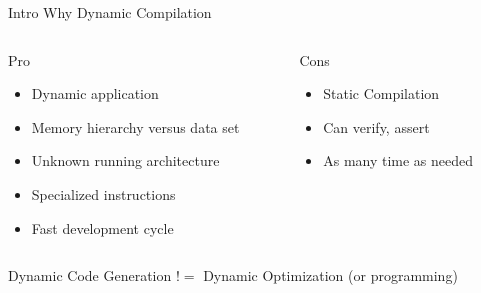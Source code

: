 %
\begin{Frame}{Intro Why Dynamic Compilation}
  \begin{columns}[t]
    \begin{column}{5cm} %
      \begin{block}{Pro}
        \begin{itemize}
        \item Dynamic application
        \item Memory hierarchy versus data set
        \item Unknown running architecture
        \item Specialized instructions
        \item Fast development cycle
        \end{itemize}
      \end{block} 
    \end{column}
    
    \begin{column}{5cm} %
      \begin{block}{Cons}
        \begin{itemize}
        \item Static Compilation
        \item Can verify, assert
        \item As many time as needed
        \end{itemize}
      \end{block}   
    \end{column}
  \end{columns}  
Dynamic Code Generation $!=$ Dynamic Optimization (or programming)
\end{Frame}


